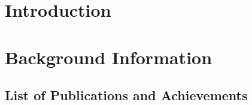 \documentclass[12pt]{report}
\begin{document}
	
	\chapter{Introduction}
	\label{ch:introduction}
	
	
	\chapter{Background Information}
	\label{ch:background_information}
	
	
	
	\clearpage
	\renewcommand{\bibname}{References}
	
	
	
	\begin{appendices}
		\chapter{List of Publications and Achievements}
		\label{app:list_of_publications}
		
		
	\end{appendices}
	
\end{document}
